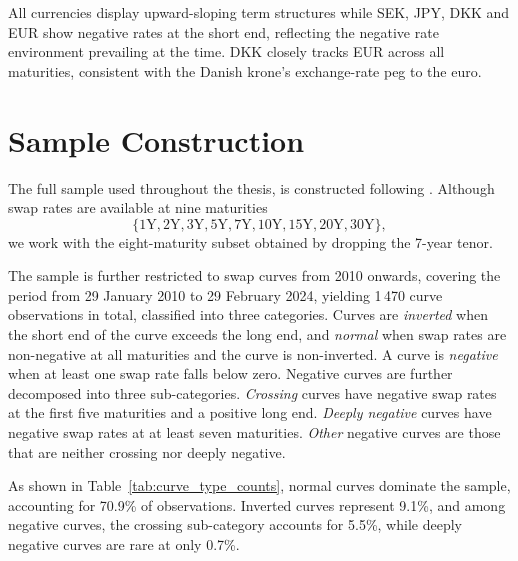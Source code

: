 All currencies display upward-sloping term structures while SEK, JPY, DKK and EUR show negative rates at the short end, reflecting the negative rate environment prevailing at the time. DKK closely tracks EUR across all maturities, consistent with the Danish krone's exchange-rate peg to the euro.

\section{Sample Construction}

The full sample used throughout the thesis, is constructed following \citet{MatinWanPoulsen2025}. Although swap rates are available at nine 
maturities
\[
\{1\text{Y},2\text{Y},3\text{Y},5\text{Y},7\text{Y},10\text{Y},15\text{Y},20\text{Y},30\text{Y}\},
\]
we work with the eight-maturity subset obtained by dropping the 7-year tenor. 

The sample is further restricted to swap curves from 2010 onwards, covering the period from 29 January 2010 to 29 February 2024, yielding 1\,470 curve observations in total, classified into three categories. Curves are \textit{inverted} when the short end of the curve exceeds the long end, and \textit{normal} when swap rates are non-negative at all maturities and the curve is non-inverted. A curve is \textit{negative} when at least one swap rate falls below zero. Negative curves are further decomposed into three sub-categories. \textit{Crossing} curves have negative swap rates at the first five maturities and a positive long end. \textit{Deeply negative} curves have negative swap rates at at least seven maturities. \textit{Other} negative curves are those that are neither crossing nor deeply negative.

As shown in Table~\ref{tab:curve_type_counts}, normal curves dominate the sample, accounting for 70.9\% of observations. Inverted curves represent 9.1\%, and among negative curves, the crossing sub-category accounts for 5.5\%, while deeply negative curves are rare at only 0.7\%.

